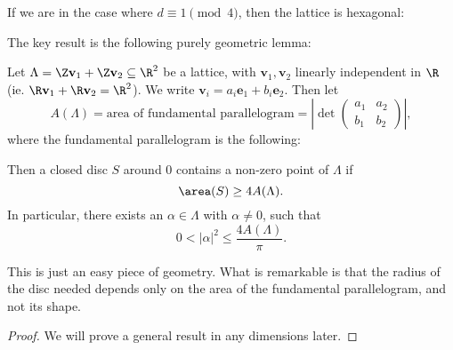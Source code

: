 \documentclass[a4paper]{article}
\begin{document}
If we are in the case where $d \equiv 1 \pmod 4$, then the lattice is hexagonal:
\begin{center}
\end{center}
The key result is the following purely geometric lemma:
\begin{lemma}
  Let $\Lambda = \Z \mathbf{v}_1 + \Z \mathbf{v}_2 \subseteq \R^2$ be a lattice, with $\mathbf{v}_1, \mathbf{v}_2$ linearly independent in $\R$ (ie. $\R \mathbf{v}_1 + \R \mathbf{v}_2 = \R^2$). We write $\mathbf{v}_i = a_i \mathbf{e}_1 + b_i \mathbf{e}_2$. Then let
  \[
    A(\Lambda) = \text{area of fundamental parallelogram} = \left|\det
    \begin{pmatrix}
      a_1 & a_2\\
      b_1 & b_2
    \end{pmatrix}\right|,
  \]
  where the fundamental parallelogram is the following:
  \begin{center}
  \end{center}
  Then a closed disc $S$ around $0$ contains a non-zero point of $\Lambda$ if
  \[
    \area(S) \geq 4 A(\Lambda).
  \]
  In particular, there exists an $\alpha \in \Lambda$ with $\alpha \not= 0$, such that
  \[
    0 < |\alpha|^2 \leq \frac{4 A(\Lambda)}{\pi}.
  \]
\end{lemma}
This is just an easy piece of geometry. What is remarkable is that the radius of the disc needed depends only on the area of the fundamental parallelogram, and not its shape.

\begin{proof}
  We will prove a general result in any dimensions later.
\end{proof}
\end{document}

